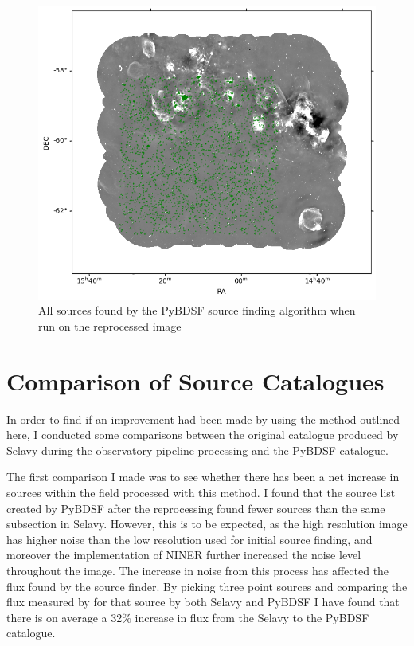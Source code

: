 \begin{figure}
    \centering
    \includegraphics[width=\linewidth]{Thesis_Template/Figures/PyBDSF_sources.png}
    \caption{All sources found by the PyBDSF source finding algorithm when run on the reprocessed image}
    \label{fig:pybdsf sourcelist}
\end{figure}


\section{Comparison of Source Catalogues}

In order to find if an improvement had been made by using the method outlined here, I conducted some comparisons between the original catalogue produced by Selavy during the observatory pipeline processing and the PyBDSF catalogue.

The first comparison I made was to see whether there has been a net increase in sources within the field processed with this method. I found that the source list created by PyBDSF after the reprocessing found fewer sources than the same subsection in Selavy.  However, this is to be expected, as the high resolution image has higher noise than the low resolution used for initial source finding, and moreover the implementation of NINER further increased the noise level throughout the image. The increase in noise from this process has affected the flux found by the source finder. By picking three point sources and comparing the flux measured by for that source by both Selavy and PyBDSF I have found that there is on average a 32$\%$ increase in flux from the Selavy to the PyBDSF catalogue.

